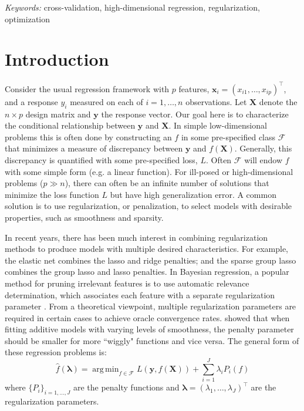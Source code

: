 \documentclass[12pt]{article}
\DeclareMathOperator*{\argmin}{arg\,min}
\begin{document}
\noindent%
{\it Keywords:}  cross-validation, high-dimensional regression, regularization, optimization
\vfill

\newpage
{}
\section{Introduction}
Consider the usual regression framework with $p$ features, $\boldsymbol x_i = (x_{i1},\ldots,x_{ip})^\top$, and a response $y_i$ measured on each of $i=1,\ldots,n$ observations. Let $\boldsymbol X$ denote the $n \times p$ design matrix and $\boldsymbol y$ the response vector. Our goal here is to characterize the conditional relationship between $\boldsymbol y$ and $\boldsymbol X$. In simple low-dimensional problems this is often done by constructing an $f$ in some pre-specified class $\mathcal{F}$ that minimizes a measure of discrepancy between $\boldsymbol y$ and $f(\boldsymbol X)$. Generally, this discrepancy is quantified with some pre-specified loss, $L$. Often $\mathcal{F}$ will endow $f$ with some simple form (e.g. a linear function). For ill-posed or high-dimensional problems ($p \gg n$), there can often be an infinite number of solutions that minimize the loss function $L$ but have high generalization error. A common solution is to use regularization, or penalization, to select models with desirable properties, such as smoothness and sparsity.

In recent years, there has been much interest in combining regularization methods to produce models with multiple desired characteristics. For example, the elastic net \citep{zou2003regression} combines the lasso and ridge penalties; and the sparse group lasso \citep{simon2013sparse} combines the group lasso and lasso penalties. In Bayesian regression, a popular method for pruning irrelevant features is to use automatic relevance determination, which associates each feature with a separate regularization parameter \citep{neal1996bayesian}. From a theoretical viewpoint, multiple regularization parameters are required in certain cases to achieve oracle convergence rates. \citet{van2014additive} showed that when fitting additive models with varying levels of smoothness, the penalty parameter should be smaller for more ``wiggly" functions and vice versa. The general form of these regression problems is:
\begin{equation} \label {eq:basic}
\hat f(\boldsymbol{\lambda}) = \argmin_{f\in\mathcal{F}} L\left (\boldsymbol{y}, f (\boldsymbol{X}) \right ) + \sum\limits_{i=1}^J \lambda_i P_i(f)
\end{equation}
where $\{P_i\}_{i=1, ..., J}$ are the penalty functions and $\boldsymbol{\lambda} = (\lambda_1, \ldots, \lambda_J)^\top$ are the regularization parameters. 
\end{document}
